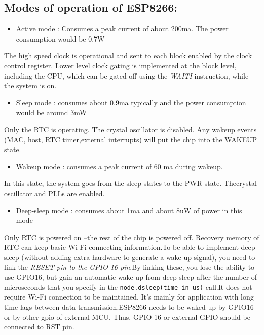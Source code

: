 \documentclass[16pt]{article}
\begin{document}
\vspace{0.2cm}

\subsection{Modes of operation of
ESP8266:}

\begin{itemize}

\item
  Active mode : Consumes a peak current of about 200ma. The power
  consumption would be 0.7W
\end{itemize}

The high speed clock is operational and sent to each block enabled by
the clock control register. Lower level clock gating is implemented at
the block level, including the CPU, which can be gated off using the
\emph{WAITI} instruction, while the system is on.

\begin{itemize}

\item
  Sleep mode : consumes about 0.9ma typically and the power consumption
  would be around 3mW
\end{itemize}

Only the RTC is operating. The crystal oscillator is disabled. Any
wakeup events (MAC, host, RTC timer,external interrupts) will put the
chip into the WAKEUP state.

\begin{itemize}

\item
  Wakeup mode : consumes a peak current of 60 ma during wakeup.
\end{itemize}

In this state, the system goes from the sleep states to the PWR state.
Thecrystal oscillator and PLLs are enabled.

\begin{itemize}

\item
  Deep-sleep mode : consumes about 1ma and about 8uW of power in this
  mode
\end{itemize}

Only RTC is powered on --the rest of the chip is powered off. Recovery
memory of RTC can keep basic Wi-Fi connecting information.To be able to implement deep sleep (without adding extra hardware to
generate a wake-up signal), you need to link the \emph{RESET pin to the
GPIO 16 pin}.By linking these, you lose the ability to use GPIO16, but
gain an automatic wake-up from deep sleep after the number of
microseconds that you specify in the \texttt{node.dsleep(time\_in\_us)}
call.It does not require Wi-Fi connection to be maintained. It's mainly for
application with long time lags between data transmission.ESP8266 needs to be waked up by GPIO16 or by other gpio of external MCU.
Thus, GPIO 16 or external GPIO should be connected to RST pin.
\end{document}
